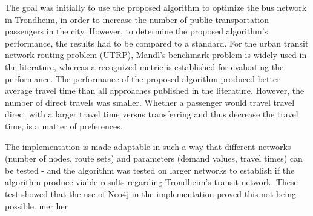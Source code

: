 The goal was initially to use the proposed algorithm to optimize the bus network in Trondheim, in order to increase the number of public transportation passengers in the city. However, to determine the proposed algorithm's performance, the results had to be compared to a standard. For the urban transit network routing problem (UTRP), Mandl's benchmark problem is widely used in the literature, whereas a recognized metric is established for evaluating the performance. The performance of the proposed algorithm produced better average travel time than all approaches published in the literature. However, the number of direct travels was smaller. Whether a passenger would travel travel direct with a larger travel time versus transferring and thus decrease the travel time, is a matter of preferences.

The implementation is made adaptable in such a way that different networks (number of nodes, route sets) and parameters (demand values, travel times) can be tested - and the algorithm was tested on larger networks to establish if the algorithm produce viable results regarding Trondheim's transit network. These test showed that the use of Neo4j in the implementation proved this not being possible. mer her

